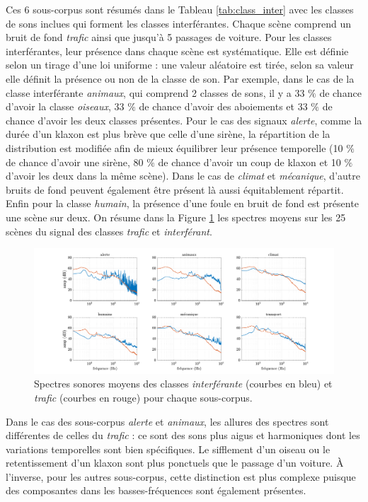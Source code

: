 Ces 6 sous-corpus sont résumés dans le Tableau \ref{tab:class_inter} avec les classes de sons inclues qui forment les classes interférantes. Chaque scène comprend un bruit de fond \textit{trafic} ainsi que jusqu'à 5 passages de voiture.
Pour les classes interférantes, leur présence dans chaque scène est systématique. Elle est définie selon un tirage d'une loi uniforme : une valeur aléatoire est tirée, selon sa valeur elle définit la présence ou non de la classe de son. Par exemple, dans le cas de la classe interférante \textit{animaux}, qui comprend 2 classes de sons, il y a 33 $\%$ de chance d'avoir la classe \textit{oiseaux}, 33 $\%$ de chance d'avoir des aboiements et 33 $\%$ de chance d'avoir les deux classes présentes. Pour le cas des signaux \textit{alerte}, comme la durée d'un klaxon est plus brève que celle d'une sirène, la répartition de la distribution est modifiée afin de mieux équilibrer leur présence temporelle (10 $\%$ de chance d'avoir une sirène, 80 $\%$ de chance d'avoir un coup de klaxon et 10 $\%$ d'avoir les deux dans la même scène).
Dans le cas de \textit{climat} et \textit{mécanique}, d'autre bruits de fond peuvent également être présent là aussi équitablement répartit. Enfin pour la classe \textit{humain}, la présence d'une foule en bruit de fond est présente une scène sur deux. 
On résume dans la Figure \ref{fig:spectre_moyen} les spectres moyens sur les 25 scènes du signal des classes \textit{trafic} et \textit{interférant}.

\begin{figure}[ht]
\centering
\includegraphics[width=\linewidth]{./figures/NMF/spectre_ambiance.pdf}
\caption{Spectres sonores moyens des classes \textit{interférante} (courbes en bleu) et \textit{trafic} (courbes en rouge) pour chaque sous-corpus.}
\label{fig:spectre_moyen}
\end{figure}


Dans le cas des sous-corpus \textit{alerte} et \textit{animaux}, les allures des spectres sont différentes de celles du \textit{trafic} : ce sont des sons plus aigus et harmoniques dont les variations temporelles sont bien spécifiques. Le sifflement d'un oiseau ou le retentissement d'un klaxon sont plus ponctuels que le passage d'un voiture. \`A l'inverse, pour les autres sous-corpus, cette distinction est plus complexe puisque des composantes dans les basses-fréquences sont également présentes.

